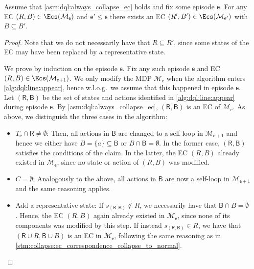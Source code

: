 \documentclass{theoretics}
\newcommand{\unionSym}{\cup}
\newcommand{\unionBin}{\mathbin{\unionSym}}
\newcommand{\intersectionSym}{\cap}
\newcommand{\intersectionBin}{\mathbin{\intersectionSym}}
\newcommand{\union}{\unionBin}
\newcommand{\intersection}{\intersectionBin}
\newcommand{\MDP}{\mathcal{M}}
\newcommand{\targetset}{T}
\newcommand{\algoepisode}{\mathsf{e}}
\begin{document}
\begin{lemma} \label{stm:dql:ec_contained_in_previous}
	Assume that \cref{asm:dql:always_collapse_ec} holds and fix some episode $\algoepisode$.
	For any EC $(R, B) \in \Ecs(\MDP_\algoepisode)$ and $\algoepisode' \leq \algoepisode$ there exists an EC $(R', B') \in \Ecs(\MDP_{\algoepisode'})$ with $B \subseteq B'$.
\end{lemma}

\begin{proof}
	Note that we do not necessarily have that $R \subseteq R'$, since some states of the EC may have been replaced by a representative state.

	We prove by induction on the episode $\algoepisode$.
	Fix any such episode $\algoepisode$ and EC $(R, B) \in \Ecs(\MDP_{\algoepisode + 1})$.
	We only modify the MDP $\MDP_\algoepisode$ when the algorithm enters \cref{alg:dql:line:appear}, hence w.l.o.g.\ we assume that this happened in episode $\algoepisode$.
	Let $(\mathsf{R}, \mathsf{B})$ be the set of states and actions identified in \cref{alg:dql:line:appear} during episode $\algoepisode$.
	By \cref{asm:dql:always_collapse_ec}, $(\mathsf{R}, \mathsf{B})$ is an EC of $\MDP_\algoepisode$.
	As above, we distinguish the three cases in the algorithm:
	\begin{itemize}
		\item $\targetset_\algoepisode \intersection \mathsf{R} \neq \emptyset$:
			Then, all actions in $\mathsf{B}$ are changed to a self-loop in $\MDP_{\algoepisode + 1}$ and hence we either have $B = \{a\} \subseteq \mathsf{B}$ or $B \intersection \mathsf{B} = \emptyset$.
			In the former case, $(\mathsf{R}, \mathsf{B})$ satisfies the conditions of the claim.
			In the latter, the EC $(R, B)$ already existed in $\MDP_\algoepisode$, since no state or action of $(R, B)$ was modified.
		\item $C = \emptyset$:
			Analogously to the above, all actions in $\mathsf{B}$ are now a self-loop in $\MDP_{\algoepisode + 1}$ and the same reasoning applies.
		\item Add a representative state:
			If $s_{(\mathsf{R}, \mathsf{B})} \notin R$, we necessarily have that $\mathsf{B} \intersection B = \emptyset$.
			Hence, the EC $(R, B)$ again already existed in $\MDP_\algoepisode$, since none of its components was modified by this step.
			If instead $s_{(\mathsf{R}, \mathsf{B})} \in R$, we have that $(\mathsf{R} \union R, \mathsf{B} \union B)$ is an EC in $\MDP_\algoepisode$, following the same reasoning as in \cref{stm:collapse:ec_correspondence_collapse_to_normal}. \qedhere 
	\end{itemize}
\end{proof}
\end{document}
